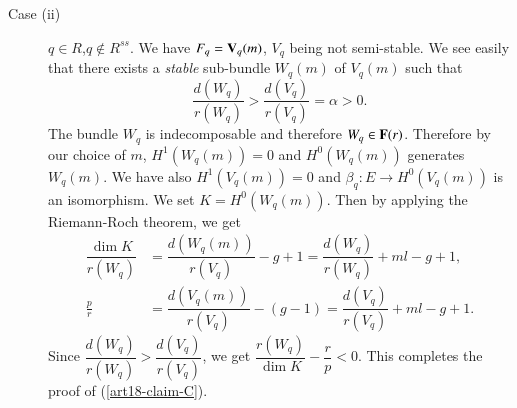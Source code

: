 \begin{description}
\item[Case (ii)] $q\in R$,\pageoriginale $q\not\in R^{ss}$. We have $F_{q}=\mathbf{V}_{q}(m)$, $V_{q}$ being not semi-stable. We see easily that there exists a {\em stable} sub-bundle $W_{q}(m)$ of $V_{q}(m)$ such that
$$
\dfrac{d(W_{q})}{r(W_{q})}>\dfrac{d(V_{q})}{r(V_{q})}=\alpha > 0.
$$
The bundle $W_{q}$ is indecomposable and therefore $W_{q}\in \mathbf{F}(r)$. Therefore by our choice of $m$, $H^{1}(W_{q}(m))=0$ and $H^{0}(W_{q}(m))$ generates $W_{q}(m)$. We have also $H^{1}(V_{q}(m))=0$ and $\beta_{q}:E\to H^{0}(V_{q}(m))$ is an isomorphism. We set $K=H^{0}(W_{q}(m))$. Then by applying the Riemann-Roch theorem, we get
\begin{align*}
\dfrac{\dim K}{r(W_{q})} &=\dfrac{d(W_{q}(m))}{r(V_{q})}-g+1=\dfrac{d(W_{q})}{r(W_{q})}+ml-g+1,\\
\frac{p}{r} &= \dfrac{d(V_{q}(m))}{r(V_{q})}-(g-1)=\dfrac{d(V_{q})}{r(V_{q})}+ml-g+1.
\end{align*}
Since $\dfrac{d(W_{q})}{r(W_{q})}>\dfrac{d(V_{q})}{r(V_{q})}$, we get $\dfrac{r(W_{q})}{\dim K}-\dfrac{r}{p}<0$. This completes the proof of (\ref{art18-claim-C}).
\end{description}


